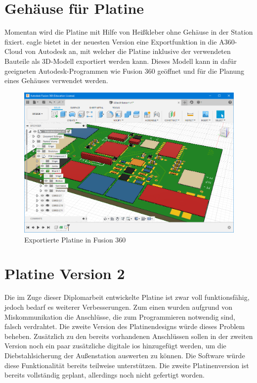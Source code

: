 \section{Gehäuse für Platine}
Momentan wird die Platine mit Hilfe von Heißkleber ohne Gehäuse in der Station fixiert.
\ac{eagle} bietet in der neuesten Version eine Exportfunktion in die A360-Cloud von Autodesk an, mit welcher die Platine inklusive der verwendeten Bauteile als 3D-Modell exportiert werden kann.
Dieses Modell kann in dafür geeigneten Autodesk-Programmen wie Fusion 360 geöffnet und für die Planung eines Gehäuses verwendet werden.
\begin{figure}[htbp!]
	\centering
	\includegraphics[width=.9\linewidth]{images/hardware-ausblick/fusion360.png}
	\caption{Exportierte Platine in Fusion 360}
\end{figure}

\section{Platine Version 2}
Die im Zuge dieser Diplomarbeit entwickelte Platine ist zwar voll funktionsfähig, jedoch bedarf es weiterer Verbesserungen.
Zum einen wurden aufgrund von Miskommunikation die Anschlüsse, die zum Programmieren notwendig sind, falsch verdrahtet. Die zweite Version des Platinendesigns würde dieses Problem beheben.
Zusätzlich zu den bereits vorhandenen Anschlüssen sollen in der zweiten Version noch ein paar zusätzliche digitale \acp{io} hinzugefügt werden, um die Diebstahlsicherung der Außenstation auswerten zu können. Die Software würde diese Funktionalität bereits teilweise unterstützen.
Die zweite Platinenversion ist bereits vollständig geplant, allerdings noch nicht gefertigt worden.
